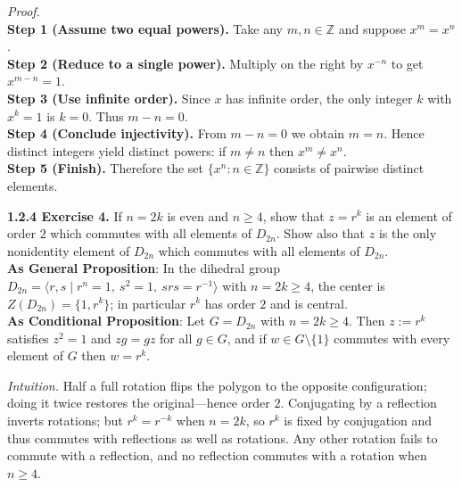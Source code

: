 \documentclass[12pt]{article}
\theoremstyle{definition}
\begin{document}
\dotfill

\emph{Proof.}\\
\textbf{Step 1 (Assume two equal powers).} Take any $m,n\in\mathbb{Z}$ and suppose $x^m=x^n$.\\
\textbf{Step 2 (Reduce to a single power).} Multiply on the right by $x^{-n}$ to get $x^{m-n}=1$.\\
\textbf{Step 3 (Use infinite order).} Since $x$ has infinite order, the only integer $k$ with $x^{k}=1$ is $k=0$. Thus $m-n=0$.\\
\textbf{Step 4 (Conclude injectivity).} From $m-n=0$ we obtain $m=n$. Hence distinct integers yield distinct powers: if $m\neq n$ then $x^m\neq x^n$.\\
\textbf{Step 5 (Finish).} Therefore the set $\{x^n:n\in\mathbb{Z}\}$ consists of pairwise distinct elements.

\newpage

\noindent \textbf{1.2.4 Exercise 4.} If $n=2k$ is even and $n\ge 4$, show that $z=r^k$ is an element of order $2$ which commutes with all elements of $D_{2n}$. Show also that $z$ is the only nonidentity element of $D_{2n}$ which commutes with all elements of $D_{2n}$.\\ %

\noindent\textbf{As General Proposition}: In the dihedral group $D_{2n}=\langle r,s\mid r^n=1,\ s^2=1,\ srs=r^{-1}\rangle$ with $n=2k\ge4$, the center is $Z(D_{2n})=\{1,r^k\}$; in particular $r^k$ has order $2$ and is central.\\

\noindent \textbf{As Conditional Proposition}: Let $G=D_{2n}$ with $n=2k\ge4$. Then $z:=r^k$ satisfies $z^2=1$ and $zg=gz$ for all $g\in G$, and if $w\in G\setminus\{1\}$ commutes with every element of $G$ then $w=r^k$.\\

\newpage

\dotfill

\emph{Intuition.} Half a full rotation flips the polygon to the opposite configuration; doing it twice restores the original—hence order $2$. Conjugating by a reflection inverts rotations; but $r^k=r^{-k}$ when $n=2k$, so $r^k$ is fixed by conjugation and thus commutes with reflections as well as rotations. Any other rotation fails to commute with a reflection, and no reflection commutes with a rotation when $n\ge4$.\\

\dotfill
\end{document}
